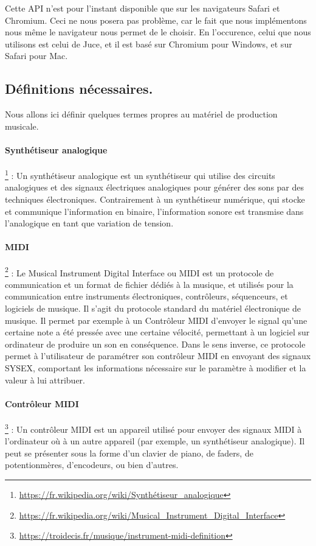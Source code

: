 \documentclass[francais]{rapportPFE}  %
\begin{document}
Cette API n'est pour l'instant disponible que sur les navigateurs Safari et Chromium. Ceci ne nous posera pas problème, car le fait que nous implémentons nous même le navigateur nous permet de le choisir. En l'occurence, celui que nous utilisons est celui de Juce, et il est basé sur Chromium pour Windows, et sur Safari pour Mac.


\subsection{Définitions nécessaires.}

Nous allons ici définir quelques termes propres au matériel de production musicale.
\paragraph{Synthétiseur analogique} \footnote{\url{https://fr.wikipedia.org/wiki/Synthétiseur_analogique}} 
:
 Un synthétiseur analogique est un synthétiseur qui utilise des circuits analogiques et des signaux électriques analogiques pour générer des sons par des techniques électroniques. Contrairement à un synthétiseur numérique, qui stocke et communique l'information en binaire, l'information sonore est transmise dans l'analogique en tant que variation de tension.
\paragraph{MIDI} \footnote{\url{https://fr.wikipedia.org/wiki/Musical_Instrument_Digital_Interface}} 
: Le Musical Instrument Digital Interface ou MIDI est un protocole de communication et un format de fichier dédiés à la musique, et utilisés pour la communication entre instruments électroniques, contrôleurs, séquenceurs, et logiciels de musique. Il s'agit du protocole standard du matériel électronique de musique. Il permet par exemple à un Contrôleur MIDI d'envoyer le signal qu'une certaine note a été pressée avec une certaine vélocité, permettant à un logiciel sur ordinateur de produire un son en conséquence. Dans le sens inverse, ce protocole permet à l'utilisateur de paramétrer son contrôleur MIDI en envoyant des signaux SYSEX, comportant les informations nécessaire sur le paramètre à modifier et la valeur à lui attribuer.
\paragraph{Contrôleur MIDI} \footnote{\url{https://troidecis.fr/musique/instrument-midi-definition}} 
:  Un contrôleur MIDI est un appareil utilisé pour envoyer des signaux MIDI à l'ordinateur où à un autre appareil (par exemple, un synthétiseur analogique). Il peut se présenter sous la forme d'un clavier de piano, de faders, de potentionmères, d'encodeurs, ou bien d'autres.
\end{document}
